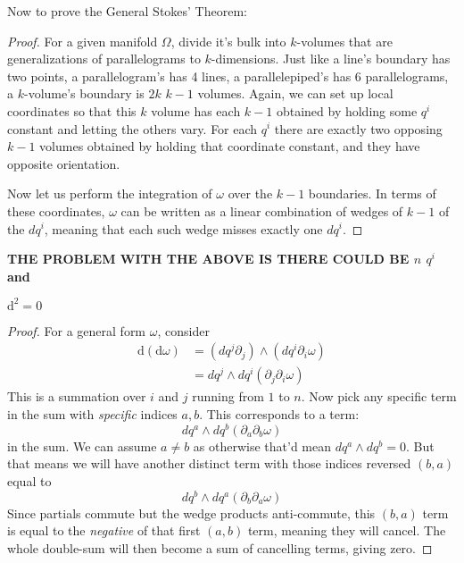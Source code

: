 \documentclass[../master.tex]{subfiles}
\begin{document}
	Now to prove the General Stokes' Theorem:
	\begin{proof}
		For a given manifold $\Omega$, divide it's bulk into $k$-volumes that are generalizations of parallelograms to $k$-dimensions. Just like a line's boundary has two points, a parallelogram's has 4 lines, a parallelepiped's has $6$ parallelograms, a $k$-volume's boundary is $2k$ $k-1$ volumes. Again, we can set up local coordinates so that this $k$ volume has each $k-1$ obtained by holding some $q^i$ constant and letting the others vary. For each $q^i$ there are exactly two opposing $k-1$ volumes obtained by holding that coordinate constant, and they have opposite orientation.
		
		Now let us perform the integration of $\omega$ over the $k-1$ boundaries. In terms of these coordinates, $\omega$ can be written as a linear combination of wedges of $k-1$ of the $dq^i$, meaning that each such wedge misses exactly one $dq^i$.
	\end{proof}
	\textbf{THE PROBLEM WITH THE ABOVE IS THERE COULD BE $n$ $q^i$ and }
	\begin{prop}
		$\mathrm d^2 = 0$
	\end{prop}
	\begin{proof}
		For a general form $\omega$, consider
		\begin{align*}
			\mathrm d (\mathrm d\omega) &= (dq^j \partial_j)\wedge (dq^i \partial_i \omega) \\
					& = dq^j \wedge dq^i (\partial_j \partial_i \omega)
		\end{align*}
		This is a summation over $i$ and $j$ running from $1$ to $n$. Now pick any specific term in the sum with \emph{specific} indices $a, b$. This corresponds to a term:
		\begin{equation*}
			dq^a \wedge dq^b (\partial_{a} \partial_{b} \omega)
		\end{equation*}
		in the sum. We can assume $a \neq b$ as otherwise that'd mean $dq^a \wedge dq^b = 0$.
		But that means we will have another distinct term with those indices reversed $(b,a)$ equal to
		\begin{equation*}
			dq^b \wedge dq^a (\partial_{b} \partial_{a} \omega)
		\end{equation*}
		Since partials commute but the wedge products anti-commute, this $(b,a)$ term is equal to the \emph{negative} of that first $(a,b)$ term, meaning they will cancel. The whole double-sum will then become a sum of cancelling terms, giving zero.
	\end{proof}
\end{document}
